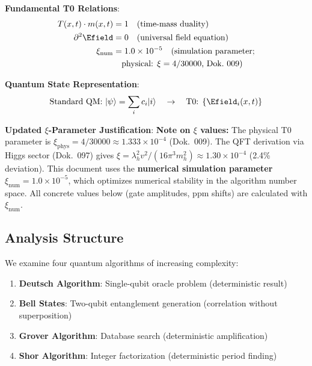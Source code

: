 	\begin{tcolorbox}[colback=blue!5!white,colframe=blue!75!black,title=Core T0 Principles with Updated $\xi$ Parameter]
		\textbf{Fundamental T0 Relations}:
\begin{align}
	T(x,t) \cdot m(x,t) &= 1 \quad \text{(time-mass duality)} \\
	\partial^2 \Efield &= 0 \quad \text{(universal field equation)} \\
	\xi_{\text{num}} &= 1.0 \times 10^{-5} \quad \text{(simulation parameter;}\\
	& \quad \text{physical: $\xi = 4/30000$, Dok.~009)}
\end{align}
		
		\textbf{Quantum State Representation}:
		\begin{equation}
			\text{Standard QM: } |\psi\rangle = \sum_i c_i |i\rangle \quad \rightarrow \quad \text{T0: } \{\Efield_i(x,t)\}
		\end{equation}
		
		\textbf{Updated $\xi$-Parameter Justification}:
		\textbf{Note on $\xi$ values:} The physical T0 parameter is $\xi_{\text{phys}} = 4/30000 \approx 1.333 \times 10^{-4}$ (Dok.~009). The QFT derivation via Higgs sector (Dok.~097) gives $\xi = \lambda_h^2 v^2/(16\pi^3 m_h^2) \approx 1.30 \times 10^{-4}$ (2.4\% deviation). This document uses the \textbf{numerical simulation parameter} $\xi_{\text{num}} = 1.0 \times 10^{-5}$, which optimizes numerical stability in the algorithm number space. All concrete values below (gate amplitudes, ppm shifts) are calculated with $\xi_{\text{num}}$.
	\end{tcolorbox}
	
	\subsection{Analysis Structure}
	
	We examine four quantum algorithms of increasing complexity:
	
	\begin{enumerate}
		\item \textbf{Deutsch Algorithm}: Single-qubit oracle problem (deterministic result)
		\item \textbf{Bell States}: Two-qubit entanglement generation (correlation without superposition)
		\item \textbf{Grover Algorithm}: Database search (deterministic amplification)
		\item \textbf{Shor Algorithm}: Integer factorization (deterministic period finding)
	\end{enumerate}
	
